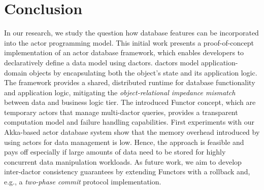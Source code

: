 
\section{Conclusion}\label{sec:conclusion}

In our research, we study the question how database features can be incorporated into the actor programming model. This initial work presents a proof-of-concept implementation of an actor database framework, which enables developers to declaratively define a data model using \glspl{dactor}.
\Glspl{dactor} model application-domain objects by encapsulating both the object's state and its application logic.
The framework provides a shared, distributed runtime for database functionality and application logic, mitigating the \textit{object-relational impedance mismatch} between data and business logic tier.
The introduced Functor concept, which are temporary actors that manage multi-\gls{dactor} queries, provides a transparent computation model and failure handling capabilities.
First experiments with our Akka-based actor database system show that the memory overhead introduced by using actors for data management is low.
Hence, the approach is feasible and pays off especially if large amounts of data need to be stored for highly concurrent data manipulation workloads.
As future work, we aim to develop inter-\gls{dactor} consistency guarantees by extending Functors with a rollback and, e.g., a \textit{two-phase commit} protocol implementation.
